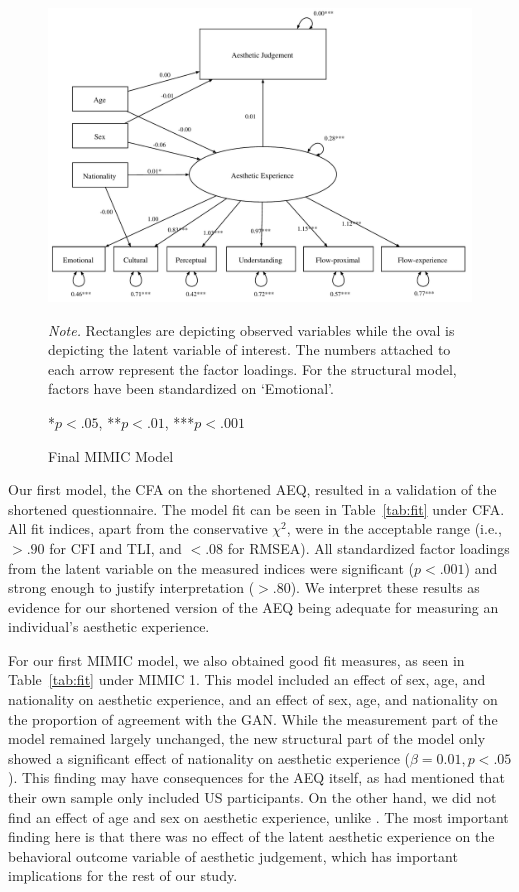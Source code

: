 \documentclass[../main.tex]{subfiles}
\begin{document}
\begin{figure}[!tb]
	\caption{Final MIMIC Model}
	\label{fig:finalmodel}
	\includegraphics[width=1\linewidth]{images/model3.pdf}
	{\textit{Note.} Rectangles are depicting observed variables while the oval is depicting the latent variable of interest. The numbers attached to each arrow represent the factor loadings. For the structural model, factors have been standardized on `Emotional'.\par
	*$p<.05$, **$p<.01$, ***$p<.001$}
\end{figure}


Our first model, the CFA on the shortened AEQ, resulted in a validation of the shortened questionnaire. The model fit can be seen in Table~\ref{tab:fit} under CFA. All fit indices, apart from the conservative $\chi^{2}$, were in the acceptable range (i.e., $>.90$ for CFI and TLI, and $<.08$ for RMSEA). All standardized factor loadings from the latent variable on the measured indices were significant ($p<.001$) and strong enough to justify interpretation ($>.80$). We interpret these results as evidence for our shortened version of the AEQ being adequate for measuring an individual's aesthetic experience.

For our first MIMIC model, we also obtained good fit measures, as seen in Table~\ref{tab:fit} under MIMIC 1. This model included an effect of sex, age, and nationality on aesthetic experience, and an effect of sex, age, and nationality on the proportion of agreement with the GAN. While the measurement part of the model remained largely unchanged, the new structural part of the model only showed a significant effect of nationality on aesthetic experience ($\beta = 0.01, p<.05$). This finding may have consequences for the AEQ itself, as \textcite{wanzerExperiencingFlowViewing2020} had mentioned that their own sample only included US participants. On the other hand, we did not find an effect of age and sex on aesthetic experience, unlike \textcite{wanzerExperiencingFlowViewing2020}. The most important finding here is that there was no effect of the latent aesthetic experience on the behavioral outcome variable of aesthetic judgement, which has important implications for the rest of our study.
\end{document}
